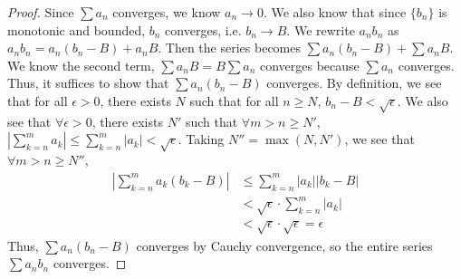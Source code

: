 \documentclass[11pt]{article}
\begin{document}
\begin{exercise}{8}
    \begin{proof}
        Since $\sum a_n$ converges, we know $a_n \to 0$. We also know that since $\{ b_n \}$ is monotonic and bounded, $b_n$ converges, i.e. $b_n \to B$. We rewrite $a_nb_n$ as $a_nb_n = a_n(b_n - B) + a_n B$. Then the series becomes $\sum a_n(b_n - B) + \sum a_n B$. We know the second term, $\sum a_n B = B \sum a_n$ converges because $\sum a_n$ converges. Thus, it suffices to show that $\sum a_n(b_n - B)$ converges. By definition, we see that for all $\epsilon > 0$, there exists $N$ such that for all $n \ge N$, $b_n - B < \sqrt{\epsilon}$. We also see that $\forall \epsilon > 0$, there exists $N'$ such that $\forall m > n \ge N'$, $\left| \sum_{k = n}^m a_k \right| \le \sum_{k = n}^m |a_k| < \sqrt{\epsilon}$. Taking $N'' = \max(N, N')$, we see that $\forall m > n \ge N''$, \begin{equation*}
            \begin{split}
                \left| \sum_{k = n}^m a_k(b_k - B) \right| & \le \sum_{k = n}^m |a_k||b_k - B| \\
                & < \sqrt{\epsilon} \cdot \sum_{k = n}^m |a_k| \\
                & < \sqrt{\epsilon} \cdot \sqrt{\epsilon} = \epsilon
            \end{split}
        \end{equation*}
        Thus, $\sum a_n (b_n - B)$ converges by Cauchy convergence, so the entire series $\sum a_nb_n$ converges. 
    \end{proof}
\end{exercise}
\end{document}
